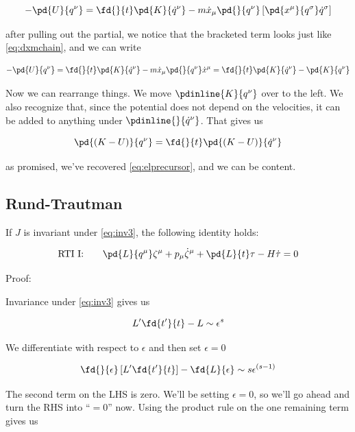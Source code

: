 \documentclass[12pt]{article}
\numberwithin{equation}{section}
\begin{document}
\begin{equation}
  -\pd{U}{q^\nu} = \fd{}{t}\pd{K}{\dot{q}^\nu} - m\dot{x}_\mu\pd{}{q^\nu}\left[ \pd{x^\mu}{q^\sigma}\dot{q}^\sigma \right]
\end{equation}

after pulling out the partial, we notice that the bracketed term looks just like \ref{eq:dxmchain}, and we can write

\begin{equation}
  -\pd{U}{q^\nu} = \fd{}{t}\pd{K}{\dot{q}^\nu} - m\dot{x}_\mu\pd{}{q^\nu}\dot{x}^\mu = \fd{}{t}\pd{K}{\dot{q}^\nu} - \pd{K}{q^\nu}
\end{equation}

Now we can rearrange things. We move $\pdinline{K}{q^\nu}$ over to the left. We also recognize that, since the potential does not depend on the velocities, it can be added to anything under $\pdinline{}{\dot{q}^\nu}$. That gives us

\begin{equation}
  \pd{(K-U)}{q^\nu} = \fd{}{t}\pd{(K-U)}{\dot{q}^\nu}
\end{equation}

as promised, we've recovered \ref{eq:elprecursor}, and we can be content.
\subsection{Rund-Trautman}
\label{sec:rundtrautman}

If $J$ is invariant under \ref{eq:inv3}, the following identity holds:

\begin{equation}
  \textrm{RTI I:}\qquad\pd{L}{q^\mu}\zeta^\mu + p_\mu\dot{\zeta}^\mu + \pd{L}{t}\tau - H\dot{\tau} = 0
\end{equation}

Proof:

Invariance under \ref{eq:inv3} gives us

\begin{equation}
  L'\fd{t'}{t} - L \sim \epsilon^s
\end{equation}

We differentiate with respect to $\epsilon$ and then set $\epsilon=0$

\begin{equation}
  \fd{}{\epsilon} \left[L'\fd{t'}{t}\right] - \fd{L}{\epsilon} \sim s\epsilon^{(s-1)}
\end{equation}

The second term on the LHS is zero. We'll be setting $\epsilon=0$, so we'll go ahead and turn the RHS into ``$=0$'' now. Using the product rule on the one remaining term gives us
\end{document}
